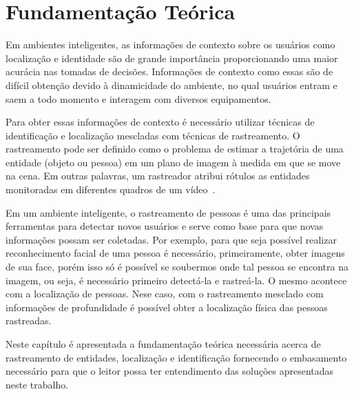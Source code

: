 \chapter{Fundamentação Teórica}
\label{cap:fundamentacao}


	Em ambientes inteligentes, as informações de contexto sobre os usuários como localização e identidade são de grande importância proporcionando uma maior acurácia nas tomadas de decisões. Informações de contexto como essas são de difícil obtenção devido à dinamicidade do ambiente, no qual usuários entram e saem a todo momento e interagem com diversos equipamentos.

	Para obter essas informações de contexto é necessário utilizar técnicas de identificação e localização mescladas com técnicas de rastreamento. O rastreamento pode ser definido como o problema de estimar a trajetória de uma entidade (objeto ou pessoa) em um plano de imagem à medida em que se move na cena. Em outras palavras, um rastreador atribui rótulos as entidades monitoradas em diferentes quadros de um vídeo~\cite{yilmaz}.

	Em um ambiente inteligente, o rastreamento de pessoas é uma das principais ferramentas para detectar novos usuários e serve como base para que novas informações possam ser coletadas. Por exemplo, para que seja possível realizar reconhecimento facial de uma pessoa é necessário, primeiramente, obter imagens de sua face, porém isso só é possível se soubermos onde tal pessoa se encontra na imagem, ou seja, é necessário primeiro detectá-la e rastreá-la. O mesmo acontece com a localização de pessoas. Nese caso, com o rastreamento mesclado com informações de profundidade é possível obter a localização física das pessoas rastreadas. 

	Neste capítulo é apresentada a fundamentação teórica necessária acerca de rastreamento de entidades, localização e identificação fornecendo o embasamento necessário para que o leitor possa ter entendimento das soluções apresentadas neste trabalho.

